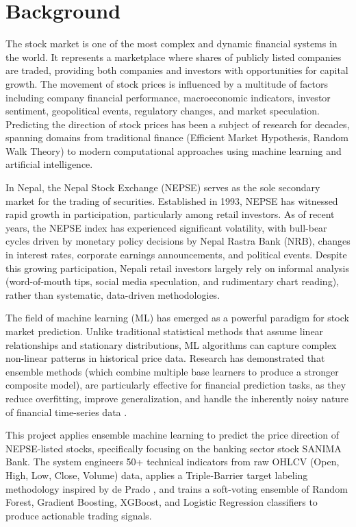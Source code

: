 \documentclass[12pt, a4paper]{report}
\begin{document}
	\section{Background}
	The stock market is one of the most complex and dynamic financial systems in the world. It represents a marketplace where shares of publicly listed companies are traded, providing both companies and investors with opportunities for capital growth. The movement of stock prices is influenced by a multitude of factors including company financial performance, macroeconomic indicators, investor sentiment, geopolitical events, regulatory changes, and market speculation. Predicting the direction of stock prices has been a subject of research for decades, spanning domains from traditional finance (Efficient Market Hypothesis, Random Walk Theory) to modern computational approaches using machine learning and artificial intelligence.
	
	In Nepal, the Nepal Stock Exchange (NEPSE) serves as the sole secondary market for the trading of securities. Established in 1993, NEPSE has witnessed rapid growth in participation, particularly among retail investors. As of recent years, the NEPSE index has experienced significant volatility, with bull-bear cycles driven by monetary policy decisions by Nepal Rastra Bank (NRB), changes in interest rates, corporate earnings announcements, and political events. Despite this growing participation, Nepali retail investors largely rely on informal analysis (word-of-mouth tips, social media speculation, and rudimentary chart reading), rather than systematic, data-driven methodologies.
	
	The field of machine learning (ML) has emerged as a powerful paradigm for stock market prediction. Unlike traditional statistical methods that assume linear relationships and stationary distributions, ML algorithms can capture complex non-linear patterns in historical price data. Research has demonstrated that ensemble methods (which combine multiple base learners to produce a stronger composite model), are particularly effective for financial prediction tasks, as they reduce overfitting, improve generalization, and handle the inherently noisy nature of financial time-series data \cite{patel2015, khaidem2016}.
	
	This project applies ensemble machine learning to predict the price direction of NEPSE-listed stocks, specifically focusing on the banking sector stock SANIMA Bank. The system engineers 50+ technical indicators from raw OHLCV (Open, High, Low, Close, Volume) data, applies a Triple-Barrier target labeling methodology inspired by de Prado \cite{deprado2018}, and trains a soft-voting ensemble of Random Forest, Gradient Boosting, XGBoost, and Logistic Regression classifiers to produce actionable trading signals.
	
\end{document}
